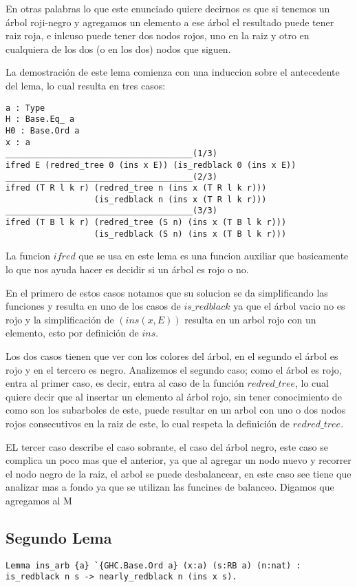 \documentclass[letterpaper,12pt,oneside]{book}
\newcommand{\arn}{árbol roji-negro }
\theoremstyle{plain}
\theoremstyle{definition}
\theoremstyle{remark}
\begin{document}
 En otras palabras lo que este enunciado quiere decirnos es que si tenemos un \arn y agregamos un elemento a ese \'arbol
 el resultado puede tener raiz roja, e inlcuso puede tener dos nodos rojos, uno en la raiz y otro en cualquiera de los dos
 (o en los dos) nodos que siguen.

 La demostraci\'on de este lema comienza con una induccion sobre el antecedente del lema, lo cual resulta en tres casos:
 \begin{verbatim}
a : Type
H : Base.Eq_ a
H0 : Base.Ord a
x : a
______________________________________(1/3)
ifred E (redred_tree 0 (ins x E)) (is_redblack 0 (ins x E))
______________________________________(2/3)
ifred (T R l k r) (redred_tree n (ins x (T R l k r))) 
                  (is_redblack n (ins x (T R l k r)))
______________________________________(3/3)
ifred (T B l k r) (redred_tree (S n) (ins x (T B l k r)))
                  (is_redblack (S n) (ins x (T B l k r)))
 \end{verbatim}

 La funcion $ifred$ que se usa en este lema es una funcion auxiliar que basicamente lo que nos ayuda hacer es decidir si un \'arbol es 
 rojo o no. 

 En el primero de estos casos notamos que su solucion se da simplificando las funciones y resulta en uno de los casos
 de $is\_redblack$ ya que el \'arbol vacio no es rojo y la simplificaci\'on de $(ins(x,E))$ resulta en un arbol rojo con un elemento,
 esto por definici\'on de $ins$.

 Los dos casos tienen que ver con los colores del \'arbol, en el segundo el \'arbol es rojo y en el tercero es negro.
 Analizemos el segundo caso; como el \'arbol es rojo, entra al primer caso, es decir, entra al caso de la funci\'on $redred\_tree$,
 lo cual quiere decir que al insertar un elemento al \'arbol rojo, sin tener conocimiento de como son los subarboles de este, puede
 resultar en un arbol con uno o dos nodos rojos consecutivos en la raiz de este, lo cual respeta la definici\'on de $redred\_tree$.

 EL tercer caso describe el caso sobrante, el caso del \'arbol negro, este caso se complica un poco mas que el anterior, ya que al 
 agregar un nodo nuevo y recorrer el nodo negro de la raiz, el arbol se puede desbalancear, en este caso see tiene que analizar mas a fondo 
 ya que se utilizan las funcines de balanceo. Digamos que agregamos al M
\subsection{Segundo Lema}
\begin{verbatim}
Lemma ins_arb {a} `{GHC.Base.Ord a} (x:a) (s:RB a) (n:nat) : 
is_redblack n s -> nearly_redblack n (ins x s).
\end{verbatim}
\end{document}
